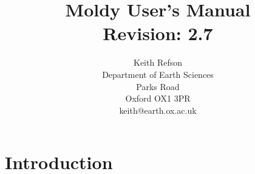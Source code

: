 % 
% 
% 
% 
\oddsidemargin=0.125in
\evensidemargin=-0.25in
\textwidth=6.25in
\topmargin=0pt
\textheight=9in
{\def\$#1${#1}%
\xdef\RCSrevision{\$Revision: 2.7 $}\xdef\manversA{$\$junk $ $}}
\title{{\Huge Moldy User's Manual}\\ \RCSrevision}
\author{Keith Refson\\Department of Earth Sciences\\Parks Road
\\Oxford OX1 3PR\\keith@earth.ox.ac.uk\\}


\newcommand{\moldy}{{\em Moldy}}
\newcommand{\etc}{{\em etc}}
\newcommand{\eg}{{\em e.g}.\ }
\newcommand{\ie}{{\em i.e}.\ }
\newcommand{\bm}[1]{\mbox{\boldmath \protect\(#1\protect\)}}

\newcommand{\erf}{\mbox{erf}}
\newcommand{\erfc}{\mbox{erfc}}
\newcommand{\insqrt}{\sqrt{\mathstrut}}

\maketitle
\tableofcontents

\chapter{Introduction}   %

